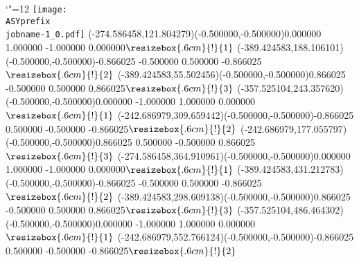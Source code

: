 \setlength{\unitlength}{1pt}
\makeatletter%
\let\ASYencoding\f@encoding%
\let\ASYfamily\f@family%
\let\ASYseries\f@series%
\let\ASYshape\f@shape%
\makeatother%
{\catcode`"=12%
\texttt{[image: \\ASYprefix\\jobname-1\_0.pdf]}%
}%
\color{ASYcolor}
\fontsize{12.000000}{14.400000}\selectfont
\usefont{\ASYencoding}{\ASYfamily}{\ASYseries}{\ASYshape}%
\ASYalignT(-274.586458,121.804279)(-0.500000,-0.500000){0.000000 1.000000 -1.000000 0.000000}{$\resizebox{.6cm}{!}{1}$}%
\color{ASYcolor}
\fontsize{12.000000}{14.400000}\selectfont
\ASYalignT(-389.424583,188.106101)(-0.500000,-0.500000){-0.866025 -0.500000 0.500000 -0.866025}{$\resizebox{.6cm}{!}{2}$}%
\color{ASYcolor}
\fontsize{12.000000}{14.400000}\selectfont
\ASYalignT(-389.424583,55.502456)(-0.500000,-0.500000){0.866025 -0.500000 0.500000 0.866025}{$\resizebox{.6cm}{!}{3}$}%
\color{ASYcolor}
\fontsize{12.000000}{14.400000}\selectfont
\ASYalignT(-357.525104,243.357620)(-0.500000,-0.500000){0.000000 -1.000000 1.000000 0.000000}{$\resizebox{.6cm}{!}{1}$}%
\color{ASYcolor}
\fontsize{12.000000}{14.400000}\selectfont
\ASYalignT(-242.686979,309.659442)(-0.500000,-0.500000){-0.866025 0.500000 -0.500000 -0.866025}{$\resizebox{.6cm}{!}{2}$}%
\color{ASYcolor}
\fontsize{12.000000}{14.400000}\selectfont
\ASYalignT(-242.686979,177.055797)(-0.500000,-0.500000){0.866025 0.500000 -0.500000 0.866025}{$\resizebox{.6cm}{!}{3}$}%
\color{ASYcolor}
\fontsize{12.000000}{14.400000}\selectfont
\ASYalignT(-274.586458,364.910961)(-0.500000,-0.500000){0.000000 1.000000 -1.000000 0.000000}{$\resizebox{.6cm}{!}{1}$}%
\color{ASYcolor}
\fontsize{12.000000}{14.400000}\selectfont
\ASYalignT(-389.424583,431.212783)(-0.500000,-0.500000){-0.866025 -0.500000 0.500000 -0.866025}{$\resizebox{.6cm}{!}{2}$}%
\color{ASYcolor}
\fontsize{12.000000}{14.400000}\selectfont
\ASYalignT(-389.424583,298.609138)(-0.500000,-0.500000){0.866025 -0.500000 0.500000 0.866025}{$\resizebox{.6cm}{!}{3}$}%
\color{ASYcolor}
\fontsize{12.000000}{14.400000}\selectfont
\ASYalignT(-357.525104,486.464302)(-0.500000,-0.500000){0.000000 -1.000000 1.000000 0.000000}{$\resizebox{.6cm}{!}{1}$}%
\color{ASYcolor}
\fontsize{12.000000}{14.400000}\selectfont
\ASYalignT(-242.686979,552.766124)(-0.500000,-0.500000){-0.866025 0.500000 -0.500000 -0.866025}{$\resizebox{.6cm}{!}{2}$}%
